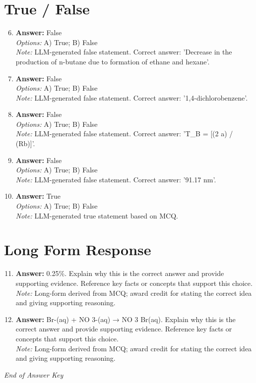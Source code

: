 \documentclass[12pt]{article}
\begin{document}
\section*{True / False}
\begin{enumerate}[label=\arabic*.]
\setcounter{enumi}{5}
\item \textbf{Answer:} False
\\ \textit{Options:} A) True; B) False
\\ \textit{Note:} LLM-generated false statement. Correct answer: 'Decrease in the production of n-butane due to formation of ethane and hexane'.
\item \textbf{Answer:} False
\\ \textit{Options:} A) True; B) False
\\ \textit{Note:} LLM-generated false statement. Correct answer: '1,4-dichlorobenzene'.
\item \textbf{Answer:} False
\\ \textit{Options:} A) True; B) False
\\ \textit{Note:} LLM-generated false statement. Correct answer: 'T\_B = [(2 a) / (Rb)]'.
\item \textbf{Answer:} False
\\ \textit{Options:} A) True; B) False
\\ \textit{Note:} LLM-generated false statement. Correct answer: '91.17 nm'.
\item \textbf{Answer:} True
\\ \textit{Options:} A) True; B) False
\\ \textit{Note:} LLM-generated true statement based on MCQ.
\end{enumerate}

\section*{Long Form Response}
\begin{enumerate}[label=\arabic*.]
\setcounter{enumi}{10}
\item \textbf{Answer:} 0.25\%. Explain why this is the correct answer and provide supporting evidence. Reference key facts or concepts that support this choice.
\\ \textit{Note:} Long-form derived from MCQ; award credit for stating the correct idea and giving supporting reasoning.
\item \textbf{Answer:} Br-(aq) + NO 3-(aq) → NO 3 Br(aq). Explain why this is the correct answer and provide supporting evidence. Reference key facts or concepts that support this choice.
\\ \textit{Note:} Long-form derived from MCQ; award credit for stating the correct idea and giving supporting reasoning.
\end{enumerate}

\vfill
\noindent\textit{End of Answer Key}
\end{document}

